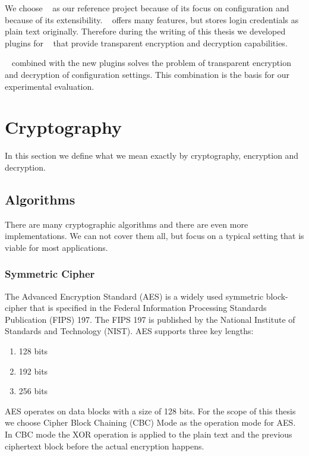 We choose \elektra~ as our reference project because of its focus on configuration and because of its extensibility.
\elektra~ offers many features, but stores login credentials as plain text originally.
Therefore during the writing of this thesis we developed plugins for \elektra~ that provide transparent encryption and decryption capabilities.

\elektra~ combined with the new plugins solves the problem of transparent encryption and decryption of configuration settings.
This combination is the basis for our experimental evaluation.

\section{Cryptography}

In this section we define what we mean exactly by cryptography, encryption and decryption.

\subsection{Algorithms}

There are many cryptographic algorithms and there are even more implementations.
We can not cover them all, but focus on a typical setting that is viable for most applications.

\subsubsection{Symmetric Cipher}

The Advanced Encryption Standard (AES) is a widely used symmetric block-cipher that is specified in the Federal Information Processing Standards Publication (FIPS) 197.
The FIPS 197 is published by the National Institute of Standards and Technology (NIST).\cite{fips197}
AES supports three key lengths:
\begin{enumerate}
  \item 128 bits
  \item 192 bits
  \item 256 bits
\end{enumerate}

AES operates on data blocks with a size of 128 bits.\cite{fips197,stallings2014}
For the scope of this thesis we choose Cipher Block Chaining (CBC) Mode as the operation mode for AES.
In CBC mode the XOR operation is applied to the plain text and the previous ciphertext block before the actual encryption happens.\cite{bruceschneier1996,stallings2014}

